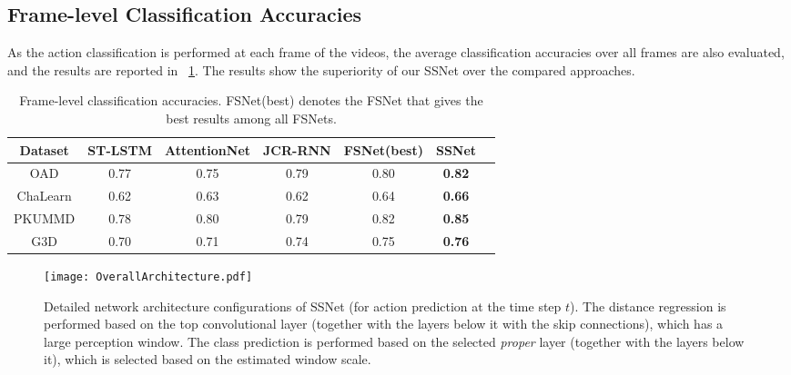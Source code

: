 \documentclass[10pt,twocolumn,letterpaper]{article}
\begin{document}
\subsection{Frame-level Classification Accuracies}
\label{sec:experiment:framelevel}


As the action classification is performed at each frame of the videos,
the average classification accuracies over all frames are also evaluated, and the results are reported in \tablename{~\ref{table:resultAvgacc}}.
The results show the superiority of our SSNet over the compared approaches.

\begin{table}[tbp]
	\caption{Frame-level classification accuracies. FSNet(best) denotes the FSNet that gives the best results among all FSNets.}
	\label{table:resultAvgacc}
	\scriptsize
	\begin{tabular}{ccccccc}
		\toprule
		Dataset          &  ST-LSTM      & AttentionNet     & JCR-RNN     &  FSNet(best)  & SSNet        \\
		\midrule
		OAD              &   0.77        &    0.75          &  0.79       &    0.80       &   \textbf{0.82}      \\
        ChaLearn         &   0.62        &    0.63          &  0.62       &    0.64       &   \textbf{0.66}       \\
        PKUMMD           &   0.78        &   0.80           &  0.79       &    0.82       &   \textbf{0.85}     \\
		G3D              &   0.70        &   0.71           &  0.74       &    0.75       &   \textbf{0.76}    \\
		\bottomrule
	\end{tabular}
\end{table}





\begin{figure*}[tbp]
\centering
	\centerline{\texttt{[image: OverallArchitecture.pdf]}}
    \centering
    \caption{
        Detailed network architecture configurations of SSNet (for action prediction at the time step $t$).
        The distance regression is performed based on the top convolutional layer (together with the layers below it with the skip connections), which has a large perception window.
        The class prediction is performed based on the selected \emph{proper} layer (together with the layers below it), which is selected based on the estimated window scale.
    }
	\label{fig:overallarchit}
\end{figure*}
\end{document}
